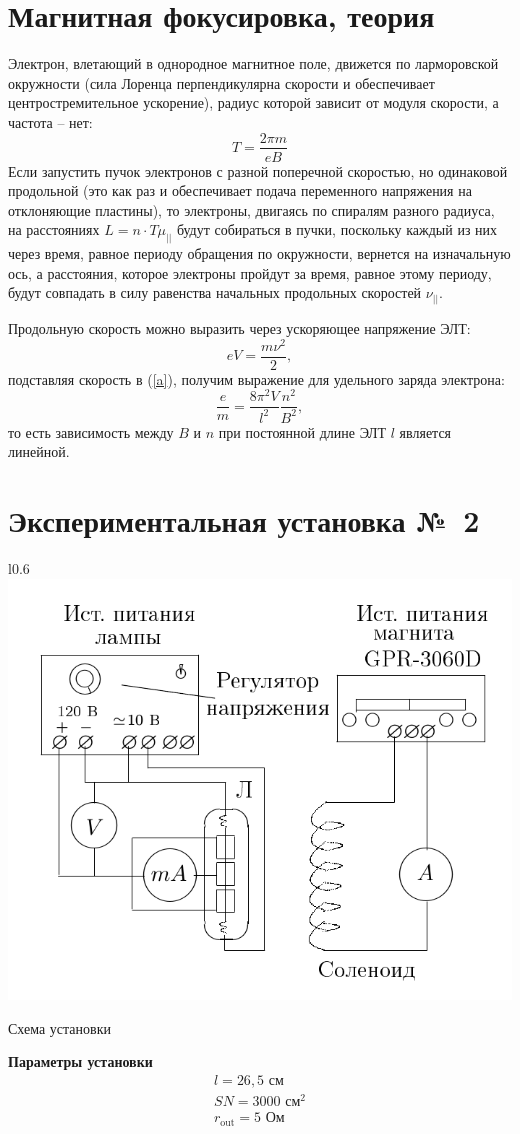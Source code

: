 \documentclass[a4paper, 12pt]{article}
\begin{document}
\section*{Магнитная фокусировка, теория}
Электрон, влетающий в однородное магнитное поле, движется по ларморовской окружности (сила Лоренца перпендикулярна скорости и обеспечивает центростремительное ускорение), радиус которой зависит от модуля скорости, а частота -- нет:
\begin{equation}
T = \frac{2\pi m}{eB} \label{a}
\end{equation}
Если запустить пучок электронов с разной поперечной скоростью, но одинаковой продольной (это как раз и обеспечивает подача переменного напряжения на отклоняющие пластины), то электроны, двигаясь по спиралям разного радиуса, на расстояниях $L = n\cdot T\mu_{||}$ будут собираться в пучки, поскольку каждый из них через время, равное периоду обращения по окружности, вернется на изначальную ось, а расстояния, которое электроны пройдут за время, равное этому периоду, будут совпадать в силу равенства начальных продольных скоростей $\nu_{||}$.

Продольную скорость можно выразить через ускоряющее напряжение ЭЛТ:
$$eV = \frac{m\nu^2}{2},$$
подставляя скорость в (\ref{a}), получим выражение для удельного заряда электрона:
$$\frac{e}{m} = \frac{8\pi^2 V}{l^2} \frac{n^2}{B^2},$$
то есть зависимость между $B$ и $n$ при постоянной длине ЭЛТ $l$ является линейной.

\pagebreak
\section*{Экспериментальная установка №~2}
\begin {wrapfigure}[17]{l}{0.6\textwidth}
\includegraphics[trim=0 0 0 20,clip,width=\linewidth]{eq2}
\caption{Схема установки}
\end {wrapfigure}
\textbf{Параметры установки}
\begin{gather*}
l=26,5 \text{ см}\\
SN=3000 \text{ см}^2\\
r_\text{out}=5 \text { Ом}
\end{gather*}
\end{document}
